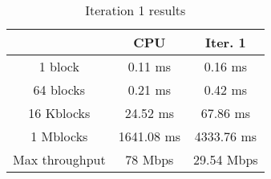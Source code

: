\begin{table}
	\caption{Iteration 1 results}
	\centering
	\begin{tabular}{ccc}
		\toprule
		 & CPU & Iter. 1 \\
		\midrule
		1 block & 0.11 ms & 0.16 ms \\
		64 blocks & 0.21 ms & 0.42 ms \\
		16 Kblocks & 24.52 ms & 67.86 ms \\
		1 Mblocks & 1641.08 ms & 4333.76 ms \\
		Max throughput & 78 Mbps & 29.54 Mbps \\
		\bottomrule
	\end{tabular}
\end{table}
